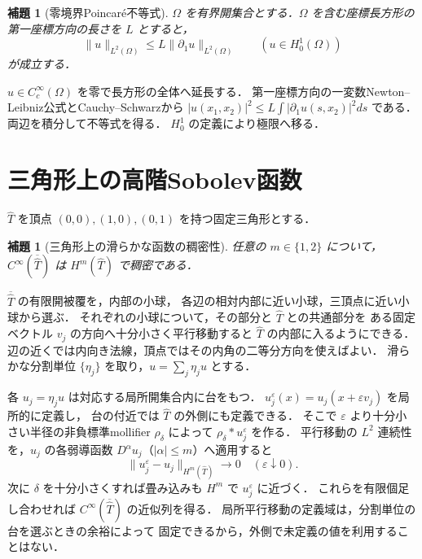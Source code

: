 \documentclass[a5paper,10pt,onecolumn]{jsarticle}
\makeatletter
\theoremstyle{mathnotetheorem}
\newtheorem{lemma}[theorem]{補題}
\renewcommand{\proofname}{証明}
\renewenvironment{proof}[1][\proofname]{%
  \par\pushQED{\qed}\normalfont\topsep4\p@\@plus2\p@\relax
  \trivlist\item[\hskip\labelsep\bfseries #1]\ignorespaces
}{\popQED\endtrivlist\@endpefalse}
\newcommand{\norm}[1]{\lVert #1\rVert}
\makeatother
\begin{document}
\begin{lemma}[零境界Poincar\'e不等式]
$\Omega$ を有界開集合とする．$\Omega$ を含む座標長方形の
第一座標方向の長さを $L$ とすると，
\[
 \norm u_{L^2(\Omega)}\le L\norm{\partial_1u}_{L^2(\Omega)}
 \qquad(u\in H_0^1(\Omega))
\]
が成立する．
\end{lemma}
\begin{proof}
$u\in C_c^\infty(\Omega)$ を零で長方形の全体へ延長する．
第一座標方向の一変数Newton--Leibniz公式とCauchy--Schwarzから
$|u(x_1,x_2)|^2\le L\int|\partial_1u(s,x_2)|^2ds$ である．
両辺を積分して不等式を得る．
$H_0^1$ の定義により極限へ移る．
\end{proof}

\section{三角形上の高階Sobolev函数}
$\widehat T$ を頂点 $(0,0),(1,0),(0,1)$ を持つ固定三角形とする．

\begin{lemma}[三角形上の滑らかな函数の稠密性]
任意の $m\in\{1,2\}$ について，
$C^\infty(\overline{\widehat T})$ は
$H^m(\widehat T)$ で稠密である．
\end{lemma}
\begin{proof}
$\overline{\widehat T}$ の有限開被覆を，内部の小球，
各辺の相対内部に近い小球，三頂点に近い小球から選ぶ．
それぞれの小球について，その部分と $\widehat T$ との共通部分を
ある固定ベクトル $v_j$ の方向へ十分小さく平行移動すると
$\widehat T$ の内部に入るようにできる．
辺の近くでは内向き法線，頂点ではその内角の二等分方向を使えばよい．
滑らかな分割単位 $\{\eta_j\}$ を取り，$u=\sum_j\eta_ju$ とする．

各 $u_j=\eta_ju$ は対応する局所開集合内に台をもつ．
$u_j^\varepsilon(x)=u_j(x+\varepsilon v_j)$ を局所的に定義し，
台の付近では $\widehat T$ の外側にも定義できる．
そこで $\varepsilon$ より十分小さい半径の非負標準mollifier
$\rho_\delta$ によって $\rho_\delta*u_j^\varepsilon$ を作る．
平行移動の $L^2$ 連続性を，$u_j$ の各弱導函数
$D^\alpha u_j$（$|\alpha|\le m$）へ適用すると
\[
 \norm{u_j^\varepsilon-u_j}_{H^m(\widehat T)}\longrightarrow0
 \quad(\varepsilon\downarrow0).
\]
次に $\delta$ を十分小さくすれば畳み込みも
$H^m$ で $u_j^\varepsilon$ に近づく．
これらを有限個足し合わせれば
$C^\infty(\overline{\widehat T})$ の近似列を得る．
局所平行移動の定義域は，分割単位の台を選ぶときの余裕によって
固定できるから，外側で未定義の値を利用することはない．
\end{proof}
\end{document}

